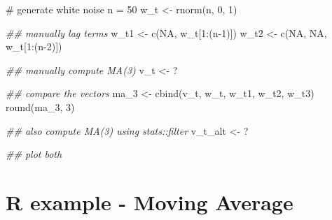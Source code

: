 \documentclass[
  letterpaper,
  DIV=11,
  numbers=noendperiod]{scrreprt}
\newenvironment{Shaded}{\begin{snugshade}}{\end{snugshade}}
\newcommand{\CommentTok}[1]{\textcolor[rgb]{0.37,0.37,0.37}{#1}}
\newcommand{\ConstantTok}[1]{\textcolor[rgb]{0.56,0.35,0.01}{#1}}
\newcommand{\DecValTok}[1]{\textcolor[rgb]{0.68,0.00,0.00}{#1}}
\newcommand{\DocumentationTok}[1]{\textcolor[rgb]{0.37,0.37,0.37}{\textit{#1}}}
\newcommand{\FunctionTok}[1]{\textcolor[rgb]{0.28,0.35,0.67}{#1}}
\newcommand{\NormalTok}[1]{\textcolor[rgb]{0.00,0.23,0.31}{#1}}
\newcommand{\OtherTok}[1]{\textcolor[rgb]{0.00,0.23,0.31}{#1}}
\newcommand{\SpecialCharTok}[1]{\textcolor[rgb]{0.37,0.37,0.37}{#1}}
\begin{document}
\begin{Shaded}
\begin{Highlighting}[]
\CommentTok{\# generate white noise}
\NormalTok{n }\OtherTok{=} \DecValTok{50}
\NormalTok{w\_t }\OtherTok{\textless{}{-}} \FunctionTok{rnorm}\NormalTok{(n, }\DecValTok{0}\NormalTok{, }\DecValTok{1}\NormalTok{)}

\DocumentationTok{\#\# manually lag terms}
\NormalTok{w\_t1 }\OtherTok{\textless{}{-}} \FunctionTok{c}\NormalTok{(}\ConstantTok{NA}\NormalTok{, w\_t[}\DecValTok{1}\SpecialCharTok{:}\NormalTok{(n}\DecValTok{{-}1}\NormalTok{)])}
\NormalTok{w\_t2 }\OtherTok{\textless{}{-}} \FunctionTok{c}\NormalTok{(}\ConstantTok{NA}\NormalTok{, }\ConstantTok{NA}\NormalTok{, w\_t[}\DecValTok{1}\SpecialCharTok{:}\NormalTok{(n}\DecValTok{{-}2}\NormalTok{)])}

\DocumentationTok{\#\# manually compute MA(3)}
\NormalTok{v\_t }\OtherTok{\textless{}{-}}\NormalTok{ ?}

\DocumentationTok{\#\# compare the vectors}
\NormalTok{ma\_3 }\OtherTok{\textless{}{-}} \FunctionTok{cbind}\NormalTok{(v\_t, w\_t, w\_t1, w\_t2, w\_t3)}
\FunctionTok{round}\NormalTok{(ma\_3, }\DecValTok{3}\NormalTok{)}

\DocumentationTok{\#\# also compute MA(3) using stats::filter}
\NormalTok{v\_t\_alt }\OtherTok{\textless{}{-}}\NormalTok{ ?}
  
\DocumentationTok{\#\# plot both}
\end{Highlighting}
\end{Shaded}

\section{R example - Moving Average}\label{r-example---moving-average-3}
\end{document}
